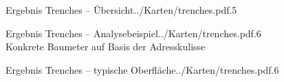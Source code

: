 \documentclass[11pt, dvipsnames,aspectratio=169]{beamer}
\begin{document}
\begin{mapframe}{Ergebnis Trenches -- Übersicht}{../Karten/trenches.pdf}{.5\linewidth}
	\centering
	\resizebox{\textwidth}{!}{
		\trenchStatistik
	} \\\vspace{.5cm}
	\hfill\begin{minipage}{.98\textwidth} \tiny
	\end{minipage}\hfill
\end{mapframe}

\begin{mapframe}{Ergebnis Trenches -- Analysebeispiel}{../Karten/trenches.pdf}{.6\textwidth}
	\centering
	 \\
	\tiny Konkrete Baumeter auf Basis der Adresskulisse
\end{mapframe}

\begin{mapframe}{Ergebnis Trenches -- typische Oberfläche}{../Karten/trenches.pdf}{.6\textwidth}
	\centering
	 \\
	\tiny \typischeOberflaeche
\end{mapframe}
\end{document}
